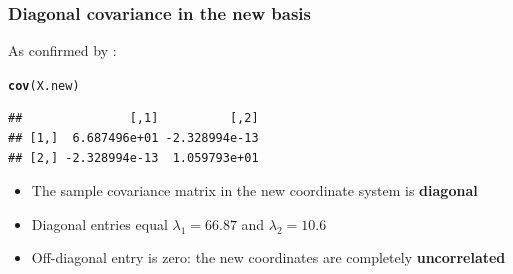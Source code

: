 \documentclass[aspectratio=169]{beamer}\usepackage[]{graphicx}\usepackage[]{xcolor}
\makeatletter
\newcommand{\hldef}[1]{\textcolor[rgb]{0.345,0.345,0.345}{#1}}%
\newcommand{\hlkwd}[1]{\textcolor[rgb]{0.737,0.353,0.396}{\textbf{#1}}}%
\newenvironment{kframe}{%
 \def\at@end@of@kframe{}%
 \ifinner\ifhmode%
  \def\at@end@of@kframe{\end{minipage}}%
  \begin{minipage}{\columnwidth}%
 \fi\fi%
 \def\FrameCommand##1{\hskip\@totalleftmargin \hskip-\fboxsep
 \colorbox{shadecolor}{##1}\hskip-\fboxsep
     \hskip-\linewidth \hskip-\@totalleftmargin \hskip\columnwidth}%
 \MakeFramed {\advance\hsize-\width
   \@totalleftmargin\z@ \linewidth\hsize
   \@setminipage}}%
 {\par\unskip\endMakeFramed%
 \at@end@of@kframe}
\newenvironment{knitrout}{}{} %
\makeatother
\begin{document}


\begin{frame}[fragile]\frametitle{Diagonal covariance in the new basis}
As confirmed by :
\vfill
\begin{knitrout}
\color{fgcolor}\begin{kframe}
\begin{alltt}
\hlkwd{cov}\hldef{(X.new)}
\end{alltt}
\begin{verbatim}
##               [,1]          [,2]
## [1,]  6.687496e+01 -2.328994e-13
## [2,] -2.328994e-13  1.059793e+01
\end{verbatim}
\end{kframe}
\end{knitrout}
\vfill
\begin{itemize}
\item The sample covariance matrix in the new coordinate system is \textbf{diagonal}
\item Diagonal entries equal $\lambda_1 = 66.87$ and $\lambda_2 = 10.6$
\item Off-diagonal entry is zero: the new coordinates are completely \textbf{uncorrelated}
\end{itemize}
\end{frame}


\end{document}
